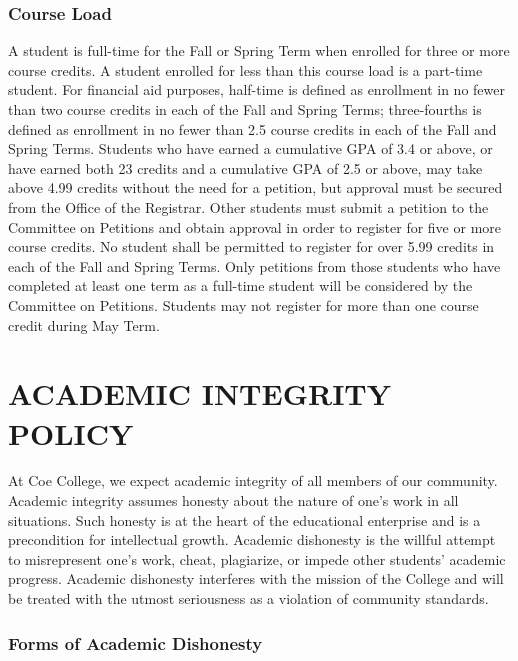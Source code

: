 \documentclass[
  letterpaper,
]{scrbook}
\begin{document}
\hypertarget{course-load}{%
\subsection{Course Load}\label{course-load}}

A student is full-time for the Fall or Spring Term when enrolled for
three or more course credits. A student enrolled for less than this
course load is a part-time student. For financial aid purposes,
half-time is defined as enrollment in no fewer than two course credits
in each of the Fall and Spring Terms; three-fourths is defined as
enrollment in no fewer than 2.5 course credits in each of the Fall and
Spring Terms. Students who have earned a cumulative GPA of 3.4 or above,
or have earned both 23 credits and a cumulative GPA of 2.5 or above, may
take above 4.99 credits without the need for a petition, but approval
must be secured from the Office of the Registrar. Other students must
submit a petition to the Committee on Petitions and obtain approval in
order to register for five or more course credits. No student shall be
permitted to register for over 5.99 credits in each of the Fall and
Spring Terms. Only petitions from those students who have completed at
least one term as a full-time student will be considered by the
Committee on Petitions. Students may not register for more than one
course credit during May Term.

\hypertarget{academic-integrity-policy}{%
\chapter{ACADEMIC INTEGRITY POLICY}\label{academic-integrity-policy}}

At Coe College, we expect academic integrity of all members of our
community. Academic integrity assumes honesty about the nature of one's
work in all situations. Such honesty is at the heart of the educational
enterprise and is a precondition for intellectual growth. Academic
dishonesty is the willful attempt to misrepresent one's work, cheat,
plagiarize, or impede other students' academic progress. Academic
dishonesty interferes with the mission of the College and will be
treated with the utmost seriousness as a violation of community
standards.

\hypertarget{forms-of-academic-dishonesty}{%
\subsection{Forms of Academic
Dishonesty}\label{forms-of-academic-dishonesty}}
\end{document}
